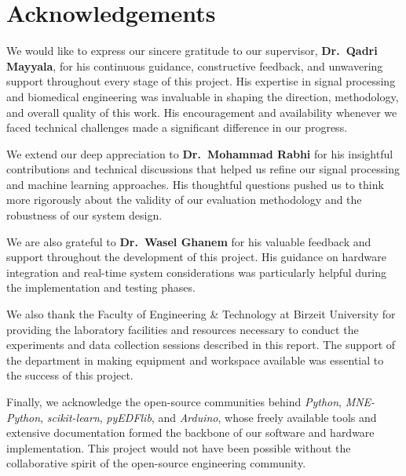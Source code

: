 \documentclass[12pt, a4paper, twoside]{report}
\begin{document}

\chapter*{Acknowledgements}

We would like to express our sincere gratitude to our supervisor,
\textbf{Dr.\ Qadri Mayyala}, for his continuous guidance, constructive
feedback, and unwavering support throughout every stage of this project.
His expertise in signal processing and biomedical engineering was
invaluable in shaping the direction, methodology, and overall quality
of this work. His encouragement and availability whenever we faced
technical challenges made a significant difference in our progress.

We extend our deep appreciation to \textbf{Dr.\ Mohammad Rabhi} for
his insightful contributions and technical discussions that helped us
refine our signal processing and machine learning approaches. His
thoughtful questions pushed us to think more rigorously about the
validity of our evaluation methodology and the robustness of our
system design.

We are also grateful to \textbf{Dr.\ Wasel Ghanem} for his valuable
feedback and support throughout the development of this project. His
guidance on hardware integration and real-time system considerations
was particularly helpful during the implementation and testing phases.

We also thank the Faculty of Engineering \& Technology at Birzeit
University for providing the laboratory facilities and resources
necessary to conduct the experiments and data collection sessions
described in this report. The support of the department in making
equipment and workspace available was essential to the success of
this project.

Finally, we acknowledge the open-source communities behind
\textit{Python}, \textit{MNE-Python}, \textit{scikit-learn},
\textit{pyEDFlib}, and \textit{Arduino}, whose freely available tools
and extensive documentation formed the backbone of our software and
hardware implementation. This project would not have been possible
without the collaborative spirit of the open-source engineering
community.
\end{document}
